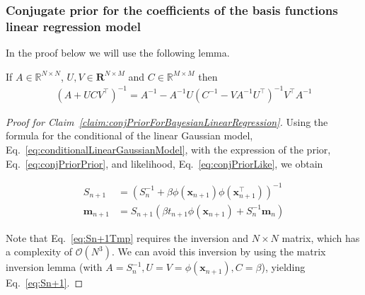 \documentclass[11pt]{beamer}
\begin{document}
\begin{frame}
    \frametitle{Conjugate prior for the coefficients of the basis functions
    linear regression model}

    \scriptsize
    In the proof below we will use the following lemma.

    \begin{lemma}
        If $A\in\mathbb{R}^{N\times N}$, $U,V\in\mathbf{R}^{N\times M}$ and
        $C\in\mathbb{R}^{M\times M}$ then
        \begin{align*}
            (A+UCV^\intercal)^{-1}=A^{-1}-A^{-1}U(C^{-1}-VA^{-1}U^\intercal)^{-1}V^\intercal A^{-1}
        \end{align*}
    \end{lemma}
    \begin{proof}[Proof for Claim~\ref{claim:conjPriorForBayesianLinearRegression}]
        Using the formula for the conditional of the linear Gaussian model,
        Eq.~\ref{eq:conditionalLinearGaussianModel}, with the expression of the prior,
        Eq.~\ref{eq:conjPriorPrior}, and
        likelihood, Eq.~\ref{eq:conjPriorLike}, we obtain

        \begin{align}
            S_{n+1}&=(S_n^{-1}+\beta
            \phi(\mathbf{x}_{n+1})\phi(\mathbf{x}_{n+1}^\intercal))^{-1}\label{eq:Sn+1Tmp}\\
            \mathbf{m}_{n+1}&=S_{n+1}(\beta t_{n+1}\phi(\mathbf{x}_{n+1})+S_n^{-1}\mathbf{m}_n)\label{eq:mn+1Tmp}
        \end{align}

        Note that Eq.~\ref{eq:Sn+1Tmp} requires the
        inversion and $N\times N$
        matrix, which has a complexity of $\mathcal{O}(N^3)$. We can avoid this
        inversion by using the matrix inversion lemma (with $A=S_n^{-1},
        U=V=\phi(\mathbf{x}_{n+1}), C=\beta$), yielding Eq.~\ref{eq:Sn+1}.

		\phantom\qedhere
    \end{proof}
    \normalsize
\end{frame}
\end{document}
